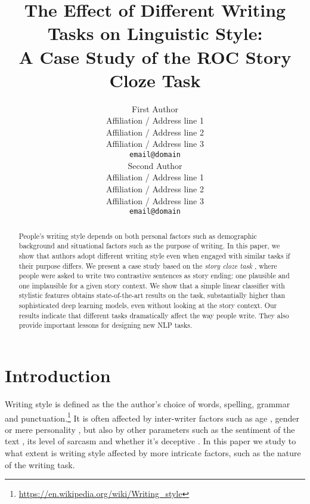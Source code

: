\documentclass[11pt,a4paper]{article}
\title{The Effect of Different Writing Tasks on Linguistic Style:\\ A Case Study of the ROC Story Cloze Task}
\author{First Author \\
  Affiliation / Address line 1 \\
  Affiliation / Address line 2 \\
  Affiliation / Address line 3 \\
  {\tt email@domain} \\\And
  Second Author \\
  Affiliation / Address line 1 \\
  Affiliation / Address line 2 \\
  Affiliation / Address line 3 \\
  {\tt email@domain} \\}
\date{}
\begin{document}
\maketitle
\begin{abstract}
People's writing style %
depends on both personal factors such as demographic background and situational factors such as the purpose of writing.
In this paper, we show that authors adopt different writing style even when engaged with similar tasks if their purpose differs.
We present a case study based on 
the {\it story cloze task} \cite{Mostafazadeh:2016}, %
where people were asked to write two contrastive sentences as story ending: one plausible and one implausible for a given story context. 
We show that a simple linear classifier with stylistic features obtains 
state-of-the-art results on the task,
substantially higher than sophisticated deep learning models,
even without looking at the story context. 
Our results indicate that different tasks dramatically affect the way people write. 
They also provide important lessons for designing new NLP tasks.

\end{abstract}

\section{Introduction}
Writing style is defined as the the author's choice of words, spelling, grammar and punctuation.\footnote{\url{https://en.wikipedia.org/wiki/Writing_style}}
It is often affected by inter-writer factors such as age \cite{Schler:2006}, gender \cite{Argamon:2003} or mere personality \cite{Stamatatos:2009}, but also by other parameters such as the sentiment of the text \cite{Davidov:2010}, its level of sarcasm \cite{Tsur:2010} and whether it's deceptive \cite{Feng:2012}.  
In this paper we study to what extent is writing style affected by more intricate factors, such as the nature of the writing task. 
\end{document}

